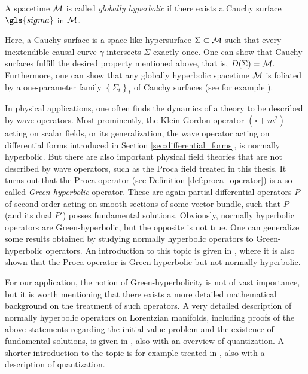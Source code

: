 \begin{definition}
	A spacetime $\mathcal{M}$ is called \emph{globally hyperbolic} if there exists a Cauchy surface $\gls{sigma}$ in $\mathcal{M}$.
\end{definition}
\noindent Here, a Cauchy surface is a space-like hypersurface $\Sigma \subset \mathcal{M}$ such that every inextendible causal curve $\gamma$ intersects $\Sigma$ exactly once. One can show that Cauchy surfaces fulfill the desired property mentioned above, that is,  $D(\Sigma) = \mathcal{M}$. Furthermore, one can show that any globally hyperbolic spacetime $\mathcal{M}$ is foliated by a one-parameter family $\left\{ \Sigma_t \right\}_t$ of Cauchy surfaces (see for example \cite[Theorem 8.3.14]{wald_GR}). \par
In physical applications, one often finds the dynamics of a theory to be described by wave operators. Most prominently, the Klein-Gordon operator $(\square + m^2)$ acting on scalar fields, or its generalization, the wave operator acting on differential forms introduced in Section \ref{sec:differential_forms}, is normally hyperbolic. But there are also important physical field theories that are not described by wave operators, such as the Proca field treated in this thesis. It turns out that the Proca operator (see Definition \ref{def:proca_operator}) is a so called \emph{Green-hyperbolic} operator. These are again partial differential operators $P$ of second order acting on smooth sections of some vector bundle, such that $P$ (and its dual $P'$) posses fundamental solutions. Obviously, normally hyperbolic operators are Green-hyperbolic, but the opposite is not true. One can generalize some results obtained by studying normally hyperbolic operators to Green-hyperbolic operators. An introduction to this topic is given in \cite{baer_green-hyperbolic}, where it is also shown that the Proca operator is Green-hyperbolic but not normally hyperbolic.\par
For our application, the notion of Green-hyperbolicity is not of vast importance, but it is worth mentioning that there exists a more detailed mathematical background on the treatment of such operators.
A very detailed description of normally hyperbolic operators on Lorentzian manifolds, including proofs of the above statements regarding the initial value problem and the existence of fundamental solutions, is given in \cite{baer_ginoux_pfaeffle}, also with an overview of quantization. A shorter introduction to the topic is for example treated in \cite{baer-ginoux_classical-and-quantum-fields}, also with a description of quantization.
%
%
%
%
%
%
%
%
%
%
%
%
